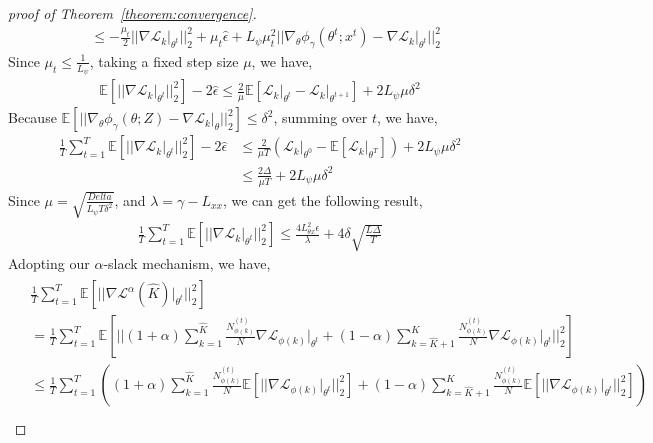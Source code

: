 \documentclass{article} %
\theoremstyle{plain}
\theoremstyle{definition}
\theoremstyle{remark}
\begin{document}
\begin{proof}[proof of Theorem~\ref{theorem:convergence}]
\begin{align}
    &\leq -\frac{\mu_t}{2}||\nabla\mathcal{L}_k\big|_{\theta^{t}}||_2^2+\mu_t\hat{\epsilon}+L_{\psi}\mu_t^2||\nabla_{\theta}\phi_{\gamma}(\theta^t;x^t)-\nabla\mathcal{L}_k\big|_{\theta^{t}}||_2^2 \nonumber
\end{align}
Since $\mu_t\leq \frac{1}{L_{\psi}}$, taking a fixed step size $\mu$, we have,
\begin{align}
    \mathbb{E}\left[||\nabla\mathcal{L}_k\big|_{\theta^{t}}||_2^2\right]-2\hat{\epsilon}\leq \frac{2}{\mu}\mathbb{E}\left[\mathcal{L}_k\big|_{\theta^{t}}-\mathcal{L}_k\big|_{\theta^{t+1}}\right]+2L_{\psi}\mu\delta^2
\end{align}
Because $\mathbb{E}\left[||\nabla_{\theta}\phi_{\gamma}(\theta;Z)-\nabla\mathcal{L}_k\big|_{\theta}||_2^2\right]\leq \delta^2$, summing over $t$, we have,
\begin{align}
    \frac{1}{T}\sum_{t=1}^{T}\mathbb{E}\left[||\nabla\mathcal{L}_k\big|_{\theta^{t}}||_2^2\right]-2\hat{\epsilon}&\leq\frac{2}{\mu T}(\mathcal{L}_k\big|_{\theta^{0}}-\mathbb{E}[\mathcal{L}_k\big|_{\theta^{T}}])+2L_{\psi}\mu\delta^2\nonumber\\
    &\leq \frac{2\Delta}{\mu T} + 2L_{\psi}\mu\delta^2
\end{align}
Since $\mu=\sqrt{\frac{Delta}{L_{\psi}T\delta^2}}$, and $\lambda=\gamma-L_{xx}$, we can get the following result,
\begin{align}
    \frac{1}{T}\sum_{t=1}^{T}\mathbb{E}\left[||\nabla\mathcal{L}_k\big|_{\theta^{t}}||_2^2\right]\leq \frac{4L_{\theta x}^2\epsilon}{\lambda}+4\delta\sqrt{\frac{L\Delta}{T}}
\end{align}
Adopting our $\alpha$-slack mechanism, we have,
\begin{align}
\begin{split}
& \frac{1}{T}\sum_{t=1}^T\mathbb{E}\left[\bigg|\bigg|\nabla \mathcal{L}^\alpha(\widehat{K})\big|_{\theta^t}\bigg|\bigg|^2_2\right] \\
& = \frac{1}{T}\sum_{t=1}^T\mathbb{E}\left[\bigg|\bigg|(1+\alpha) \sum_{k=1}^{\widehat{K}} \frac{N_{\phi(k)}^{(t)}}{N}\nabla\mathcal{L}_{\phi(k)}\big|_{\theta^t} + (1-\alpha) \sum_{k=\widehat{K}+1}^{K} \frac{N_{\phi(k)}^{(t)}}{N}\nabla\mathcal{L}_{\phi(k)}\big|_{\theta^t}\bigg|\bigg|^2_2\right] \\  
& \leq \frac{1}{T}\sum_{t=1}^T\left((1+\alpha) \sum_{k=1}^{\widehat{K}} \frac{N_{\phi(k)}^{(t)}}{N}\mathbb{E}\left[\bigg|\bigg|\nabla\mathcal{L}_{\phi(k)}\big|_{\theta^t}\bigg|\bigg|^2_2\right] + (1-\alpha) \sum_{k=\widehat{K}+1}^{K} \frac{N_{\phi(k)}^{(t)}}{N}\mathbb{E}\left[\bigg|\bigg|\nabla\mathcal{L}_{\phi(k)}\big|_{\theta^t}\bigg|\bigg|^2_2\right]\right) \\

\end{split}
\end{align}
\end{proof}
\end{document}
